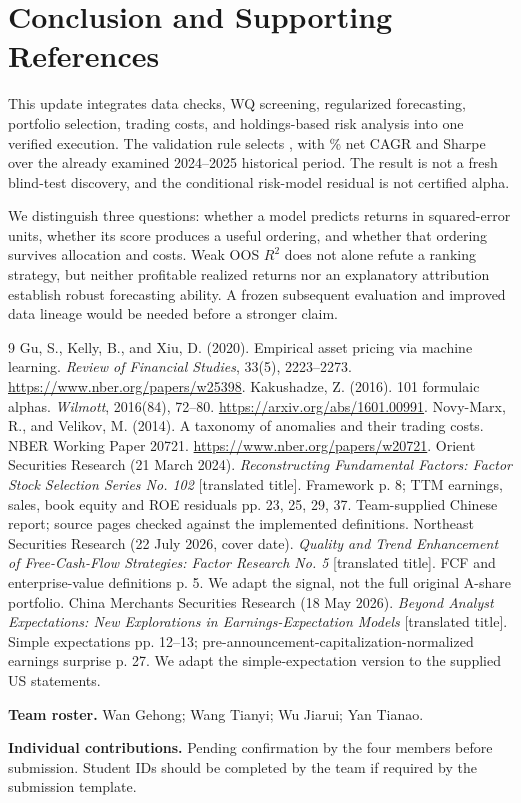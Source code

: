 \documentclass[11pt]{article}
\begin{document}
\section{Conclusion and Supporting References}
This update integrates data checks, WQ screening, regularized forecasting, portfolio selection, trading costs, and holdings-based risk analysis into one verified execution. The validation rule selects \SelectedName{}, with \SelectedCAGR\% net CAGR and \SelectedSharpe{} Sharpe over the already examined 2024--2025 historical period. The result is not a fresh blind-test discovery, and the conditional risk-model residual is not certified alpha.

We distinguish three questions: whether a model predicts returns in squared-error units, whether its score produces a useful ordering, and whether that ordering survives allocation and costs. Weak OOS $R^2$ does not alone refute a ranking strategy, but neither profitable realized returns nor an explanatory attribution establish robust forecasting ability. A frozen subsequent evaluation and improved data lineage would be needed before a stronger claim.

\begin{thebibliography}{9}
 Gu, S., Kelly, B., and Xiu, D. (2020). Empirical asset pricing via machine learning. \emph{Review of Financial Studies}, 33(5), 2223--2273. \url{https://www.nber.org/papers/w25398}.
 Kakushadze, Z. (2016). 101 formulaic alphas. \emph{Wilmott}, 2016(84), 72--80. \url{https://arxiv.org/abs/1601.00991}.
 Novy-Marx, R., and Velikov, M. (2014). A taxonomy of anomalies and their trading costs. NBER Working Paper 20721. \url{https://www.nber.org/papers/w20721}.
 Orient Securities Research (21 March 2024). \emph{Reconstructing Fundamental Factors: Factor Stock Selection Series No. 102} [translated title]. Framework p. 8; TTM earnings, sales, book equity and ROE residuals pp. 23, 25, 29, 37. Team-supplied Chinese report; source pages checked against the implemented definitions.
 Northeast Securities Research (22 July 2026, cover date). \emph{Quality and Trend Enhancement of Free-Cash-Flow Strategies: Factor Research No. 5} [translated title]. FCF and enterprise-value definitions p. 5. We adapt the signal, not the full original A-share portfolio.
 China Merchants Securities Research (18 May 2026). \emph{Beyond Analyst Expectations: New Explorations in Earnings-Expectation Models} [translated title]. Simple expectations pp. 12--13; pre-announcement-capitalization-normalized earnings surprise p. 27. We adapt the simple-expectation version to the supplied US statements.
\end{thebibliography}

\textbf{Team roster.} Wan Gehong; Wang Tianyi; Wu Jiarui; Yan Tianao.

\textbf{Individual contributions.} Pending confirmation by the four members before submission. Student IDs should be completed by the team if required by the submission template.
\end{document}
